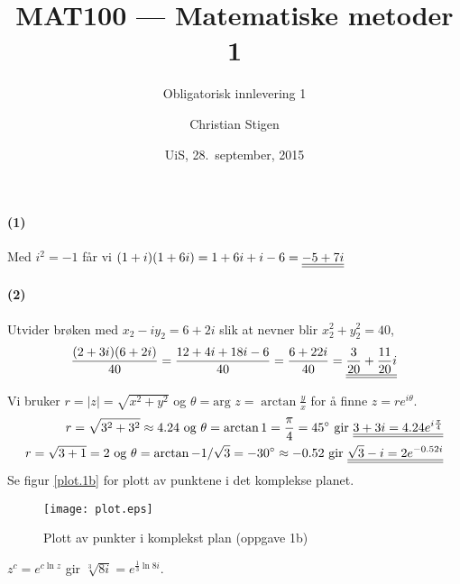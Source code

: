 \documentclass[a4paper,norsk,12pt]{article}
\title{MAT100 --- Matematiske metoder 1}
\subtitle{Obligatorisk innlevering 1}
\author{Christian Stigen}
\date{UiS, 28.~september, 2015}
\begin{document}
\maketitle


\paragraph{(1)}
Med $i^2 = -1$ får vi
\begin{math}
  (1+i)(1+6i) = 1+6i+i-6 = {\underline{\underline{-5+7i}}}
\end{math}

\paragraph{(2)}
Utvider brøken med $x_2 - iy_2 = 6 + 2i$ slik at nevner blir $x_2^2 +
y_2^2 = 40$,
\begin{equation*}
  \frac{(2+3i)(6+2i)}{40} = \frac{12+4i+18i-6}{40}
  = \frac{6+22i}{40} = {\underline{\underline{\frac{3}{20} + \frac{11}{20}i}}}
\end{equation*}


Vi bruker $r = |z| = \sqrt{x^2+y^2}$ og $\theta = \text{arg } z =
\arctan\frac{y}{x}$ for å finne $z = re^{i\theta}$.
\begin{equation*}
\begin{split}
  r = \sqrt{3^2+3^2} \approx 4.24 \text{ og } \theta = \arctan{1} =
  \frac{\pi}{4} = 45^\circ \text{ gir } {\underline{\underline{3+3i = 4.24 e^{i\frac{\pi}{4}}}}}
  \\
  r=\sqrt{3+1}=2 \text{ og } \theta = \arctan{-1/\sqrt{3}} = -30^\circ \approx -0.52
  \text{ gir }
  {\underline{\underline{\sqrt{3}-i = 2e^{-0.52i}}}}
\end{split}
\end{equation*}
Se figur \vref{plot.1b} for plott av punktene i det komplekse planet.
%
\begin{figure}
\centering
\texttt{[image: plot.eps]}
\caption{Plott av punkter i komplekst plan (oppgave 1b)}
\label{plot.1b}
\end{figure}

$z^c = e^{c\ln{z}}$ gir $\sqrt[3]{8i} = e^{\frac{1}{3}\ln{8i}}$.
\begin{equation*}
\begin{split}
\end{split}
\end{equation*}

\end{document}
